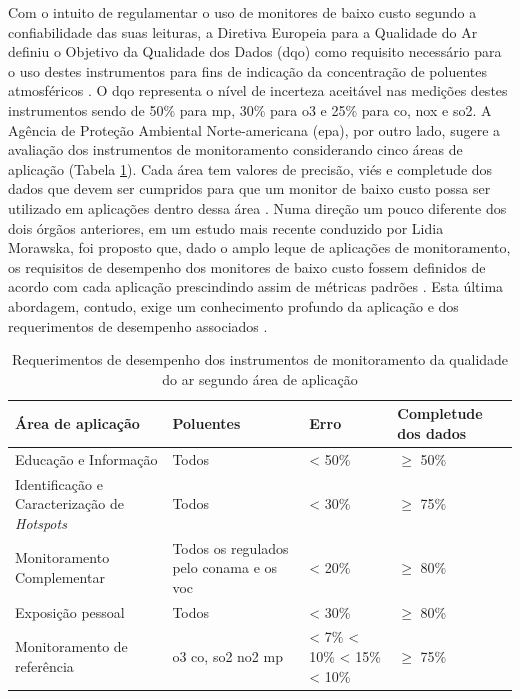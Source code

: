 Com o intuito de regulamentar o uso de monitores de baixo custo segundo a confiabilidade das suas leituras, a Diretiva Europeia para a Qualidade do Ar definiu o Objetivo da Qualidade dos Dados (\gls{dqo}) como requisito necessário para o uso destes instrumentos para fins de indicação da concentração de poluentes atmosféricos \cite{EU2008DirectiveEurope}. O \gls{dqo} representa o nível de incerteza aceitável nas medições destes instrumentos sendo de 50\% para \acrshort{mp}, 30\% para \acrshort{o3} e 25\% para \acrshort{co}, \acrshort{nox} e \acrshort{so2}. A Agência de Proteção Ambiental Norte-americana (\gls{epa}), por outro lado, sugere a avaliação dos instrumentos de monitoramento considerando cinco áreas de aplicação (Tabela \ref{tab:monitoring-areas-EPA}). Cada área tem valores de precisão, viés e completude dos dados que devem ser cumpridos para que um monitor de baixo custo possa ser utilizado em aplicações dentro dessa área \cite{Williams2014AirGuidebook}. Numa direção um pouco diferente dos dois órgãos anteriores, em um estudo mais recente conduzido por Lidia Morawska, foi proposto que, dado o amplo leque de aplicações de monitoramento, os requisitos de desempenho dos monitores de baixo custo fossem definidos de acordo com cada aplicação prescindindo assim de métricas padrões \cite{Morawska2018ApplicationsGone}. Esta última abordagem, contudo, exige um conhecimento profundo da aplicação e dos requerimentos de desempenho associados \cite{Morawska2018ApplicationsGone}.

\begin{table}[t]
    \caption{Requerimentos de desempenho dos instrumentos de monitoramento da qualidade do ar segundo área de aplicação}
    \begin{tabular}{ m{} m{} m{} m{}}
        \hline
        Área de aplicação & Poluentes & Erro & Completude dos dados \\ [0.5ex] 
        \hline
        Educação e Informação & Todos & < 50\% & $\geq$ 50\% \\ [0.5ex]
        \hline
        Identificação e Caracterização de \textit{Hotspots}\footnotemark & Todos & < 30\% & $\geq$ 75\% \\ [0.5ex]
        \hline
        Monitoramento Complementar & Todos os regulados pelo \gls{conama} e os \acrshort{voc} & < 20\% & $\geq$ 80\% \\ [0.5ex]
        \hline
        Exposição pessoal & Todos & < 30\% & $\geq$ 80\% \\ [0.5ex]
        \hline
        Monitoramento de referência & \acrshort{o3} \newline \acrshort{co}, \acrshort{so2} \newline \acrshort{no2} \newline \acrshort{mp} & < 7\% \newline < 10\% \newline < 15\% \newline < 10\% & $\geq$ 75\% \\ [0.5ex]
        \hline
    \end{tabular}
    \label{tab:monitoring-areas-EPA}
\end{table}
